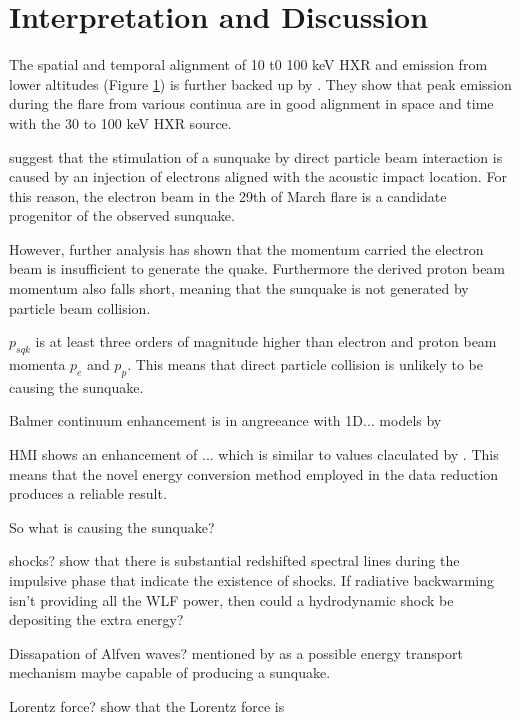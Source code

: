 \section{Interpretation and Discussion}

The spatial and temporal alignment of 10 t0 100 keV HXR and emission from lower altitudes (Figure \ref{}) is further backed up by \cite{2016ApJ...816...88K}. They show that peak emission during the flare from various continua are in good alignment in space and time with the 30 to 100 keV HXR source.  

\cite{1998Natur.393..317K} suggest that the stimulation of a sunquake by direct particle beam interaction is caused by an injection of electrons aligned with the acoustic impact location. For this reason, the electron beam in the 29th of March flare is a candidate progenitor of the observed sunquake. 

However, further analysis has shown that the momentum carried the electron beam is insufficient to generate the quake. Furthermore the derived proton beam momentum also falls short, meaning that the sunquake is not generated by particle beam collision.    



$p_{sqk}$ is at least three orders of magnitude higher than electron and proton beam momenta $p_e$ and $p_p$. This means that direct particle collision is unlikely to be causing the sunquake. 


Balmer continuum enhancement is in angreeance with 1D... models by \cite{}

HMI shows an enhancement of ... which is similar to values claculated by \cite{}. This means that the novel energy conversion method employed in the data reduction produces a reliable result.



So what is causing the sunquake?

shocks? 
\cite{2015ApJ...812...35M} show that there is substantial redshifted spectral lines during the impulsive phase that indicate the existence of shocks. If radiative backwarming isn't providing all the WLF power, then could a hydrodynamic shock be depositing the extra energy?


Dissapation of Alfven waves?
\cite{1982SoPh...80...99E} mentioned by \cite{2015ApJ...812...35M} as a possible energy transport mechanism maybe capable of producing a sunquake.

Lorentz force?
\cite{2014ApJ...796...85J} show that the Lorentz force is  

